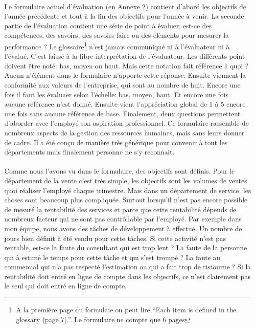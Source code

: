 \paragraph{}Le formulaire actuel d'évaluation (en Annexe 2) contient d'abord les objectifs de l'année précédente et tout à la fin des objectifs pour l'année à venir. La seconde partie de l'évaluation contient une série de point à évaluer, est-ce des compétences, des savoirs, des savoirs-faire ou des éléments pour mesurer la performance ? Le glossaire\footnote{A la première page du formulaie on peut lire \enquote{Each item is defined in the glossary (page 7).}. Le formulaire ne compte que 6 pages} n'est jamais communiqué ni à l'évaluateur ni à l'évalué. C'est laissé à la libre interprétation de l'évaluateur. Les différents point doivent être noté: bas, moyen ou haut. Mais cette notation fait référence à quoi ? Aucun n'élément dans le formulaire n'apporte cette réponse. Ensuite viennent la conformité aux valeurs de l'entreprise, qui sont au nombre de huit. Encore une fois il faut les évaluaer selon l'échelle: bas, moyen, haut. Et encore une fois aucune référence n'est donné. Ensuite vient l'appréciation global de 1 à 5 encore une fois sans aucune référence de base. Finalement, deux questions permettent d'aborder avec l'employé son aspiration professionnel. Ce formulaire rassemble de nombreux aspects de la gestion des ressources humaines, mais sans leurs donner de cadre. Il a été conçu de manière très générique pour convenir à tout les départements mais finalement personne ne s'y reconnait.

\paragraph{}Comme nous l'avons vu dans le formulaire, des objectifs sont définis. Pour le département de la vente c'est très simple, les objectifs sont les volumes de ventes quoi réaliser l'employé chaque trimestre. Mais dans un département de service, les choses sont beaucoup plus compliquée. Surtout lorsqu'il n'est pas encore possible de mesuré la rentabilité des services et parce que cette rentabilité dépends de nombreux facteur qui ne sont pas contrôllable par l'employé. Par exemple dans mon équipe, nous avons des tâches de développement à effectué. Un nombre de jours bien définit à été vendu pour cette tâches. Si cette activité n'est pas rentable, est-ce la faute du consultant qui est trop lent ? La faute de la personne qui à estimé le temps pour cette tâche et qui s'est trompé ? La faute au commercial qui n'a pas respecté l'estimation ou qui a fait trop de ristourne ? Si la rentabilité doit entré en ligne de compte dans les objectifs, ce n'est clairement pas le seul qui doit entré en ligne de compte. 

